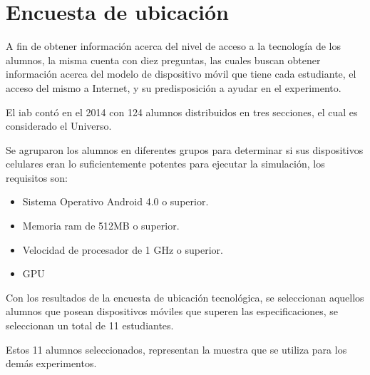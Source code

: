 \section{Encuesta de ubicación}

A fin de obtener información acerca del nivel de acceso a la tecnología de los
alumnos, la misma cuenta con diez preguntas, las cuales buscan obtener
información acerca del modelo de dispositivo móvil que tiene cada estudiante, el
acceso del mismo a Internet, y su predisposición a ayudar en el experimento.

El \Gls{iab} contó en el 2014 con 124 alumnos distribuidos en tres secciones,
el cual es considerado el Universo.

Se agruparon los alumnos en diferentes grupos para determinar si sus dispositivos
celulares eran lo suficientemente potentes para
ejecutar la simulación, los requisitos son:

\begin{itemize}
\item Sistema Operativo Android 4.0 o superior.
\item Memoria ram de 512MB o superior.
\item Velocidad de procesador de 1 GHz o superior.
\item GPU 
\end{itemize}

Con los resultados de la encuesta de ubicación tecnológica, se seleccionan
aquellos alumnos que posean dispositivos móviles que superen las especificaciones,
se seleccionan un total de 11 estudiantes.

Estos 11 alumnos seleccionados, representan la muestra que se utiliza para los
demás experimentos.
